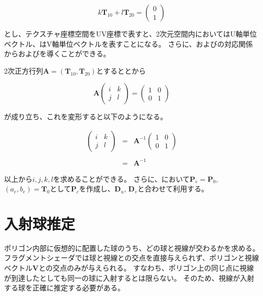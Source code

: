 \begin{equation}
k\bm{T}_{10} + l\bm{T}_{20} = 
\begin{pmatrix}
0\\
1
\end{pmatrix}
\label{EUnit2v}
\end{equation}

\noindent
とし、テクスチャ座標空間をUV座標で表すと、2次元空間内においてはU軸単位ベクトル、はV軸単位ベクトルを表すことになる。
さらに、およびの対応関係からおよびを導くことができる。

2次正方行列$\bm{A} = (\bm{T}_{10}, \bm{T}_{20})$とするととから

\begin{equation}
\bm{A} 
\begin{pmatrix}
i &k\\
j &l
\end{pmatrix}
=
\begin{pmatrix}
1 &0\\
0 &1
\end{pmatrix}
\label{EAx=I}
\end{equation}

\noindent
{}が成り立ち、これを変形すると以下のようになる。

\begin{eqnarray}
\label{EIjkl}
\begin{pmatrix}
i &k\\
j &l
\end{pmatrix}
&=& \bm{A}^{-1}
\begin{pmatrix}
1 &0\\
0 &1
\end{pmatrix}\nonumber\\
\nonumber\\
&=& \bm{A}^{-1}
\end{eqnarray}

\noindent
以上から$i,j,k,l$を求めることができる。
さらに、において$\bm{P}_e = \bm{P}_0$, $(a_e, b_e) = \bm{T}_0$として$\bm{P}_c$を作成し、$\bm{D}_u$, $\bm{D}_v$と合わせて利用する。

\section{入射球推定}
\label{SFirstsphere}

ポリゴン内部に仮想的に配置した球のうち、どの球と視線が交わるかを求める。
フラグメントシェーダでは球と視線との交点を直接与えられず、ポリゴンと視線ベクトル$\bm{V}$との交点のみが与えられる。
すなわち、ポリゴン上の同じ点に視線が到達したとしても同一の球に入射するとは限らない。
そのため、視線が入射する球を正確に推定する必要がある。


